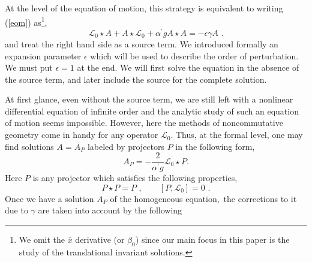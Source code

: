 \documentclass[a4paper,aps,preprint,nofootinbib,eqsecnum]{revtex4}
\begin{document}
At the level of the equation of motion, this strategy is equivalent to
writing (\ref{eom}) as\footnote{%
We omit the $\bar{x}$ derivative (or $\beta _{0}$) since our main focus in
this paper is the study of the translational invariant solutions.},
\begin{equation}
{\mathcal{L}_{0}}\star A+A\star {\mathcal{L}_{0}}+{\alpha ^{\prime }}gA\star
A=-\epsilon \gamma A\,\,.  \label{eom2}
\end{equation}%
and treat the right hand side as a source term. We introduced formally an
expansion parameter $\epsilon $ which will be used to describe the order of
perturbation. We must put $\epsilon =1$ at the end. We will first solve the
equation in the absence of the source term, and later include the source for
the complete solution.

At first glance, even without the source term, we are still left with a
nonlinear differential equation of infinite order and the analytic study of
such an equation of motion seems impossible. However, here the methods of
noncommutative geometry come in handy for any operator ${\mathcal{L}_{0}.}$
Thus, at the formal level, one may find solutions $A=A_{P}$ labeled by
projectors $P$ in the following form,
\begin{equation}\label{e-Ap}
A_{P}=-\frac{2}{{\alpha ^{\prime }}g}{\mathcal{L}_{0}}\star P.
\end{equation}%
Here $P$ is any projector which satisfies the following properties,
\begin{equation}
P\star P=P\,\,,\qquad \left[ P,{\mathcal{L}_{0}}\right] =0\,\,.
\end{equation}%
Once we have a solution $A_{P}$ of the homogeneous equation$,$ the
corrections to it due to $\gamma $ are taken into account by the following
\end{document}
